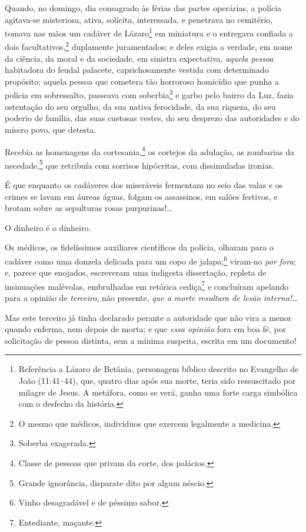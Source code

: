 Quando, no domingo, dia consagrado às férias das partes operárias, a
polícia agitava-se misteriosa, ativa, solícita, interessada, e
penetrava no cemitério, tomava nas mãos um cadáver de Lázaro\footnote{
  Referência a Lázaro de Betânia, personagem bíblico descrito no \label{lazaro}
  Evangelho de João (11:41--44), que, quatro dias após sua morte, teria
  sido ressuscitado por milagre de Jesus. A metáfora, como se verá,
  ganha uma forte carga simbólica com o desfecho da história.} em miniatura e o entregava confiada a dois
facultativos,\footnote{O mesmo que médicos, indivíduos que exercem
  legalmente a medicina.} duplamente juramentados; e deles exigia a
verdade, em nome da ciência, da moral e da sociedade, em sinistra
expectativa, \emph{aquela pessoa} habitadora do feudal palacete,
caprichosamente vestida com determinado propósito; aquela pessoa que
cometera tão horroroso homicídio que punha a polícia em sobressalto,
passeava com soberbia\footnote{Soberba exagerada.} e garbo pelo bairro
da Luz, fazia ostentação do seu orgulho, da sua nativa ferocidade, da
sua riqueza, do seu poderio de família, das suas custosas vestes, do seu
desprezo das autoridades e do mísero povo, que detesta.

Recebia as homenagens da cortesania,\footnote{Classe de pessoas que
  privam da corte, dos palácios.} os cortejos da adulação, as zombarias
da necedade,\footnote{Grande ignorância, disparate dito por algum
  néscio.} que retribuía com sorrisos hipócritas, com dissimuladas
ironias.

É que enquanto os cadáveres dos miseráveis fermentam no seio das valas e
os crimes se lavam em áureas águas, folgam os assassinos, em salões
festivos, e brotam sobre as sepulturas rosas purpurinas!\ldots{}

O dinheiro é o dinheiro.

Os médicos, os fidelíssimos auxiliares científicos da polícia, olharam
para o cadáver como uma donzela delicada para um copo de
jalapa;\footnote{Vinho desagradável e de péssimo sabor.} viram-no
\emph{por fora}; e, parece que enojados, escreveram uma indigesta
dissertação, repleta de insinuações malévolas, embrulhadas em retórica
cediça\footnote{Entediante, maçante.} e concluíram apelando para a
opinião de \emph{terceiro}, não presente, \emph{que a morte resultara de
lesão interna!\ldots{}}

Mas este terceiro já tinha declarado perante a autoridade que não vira a
menor quando enferma, nem depois de morta; e que \emph{essa opinião}
fora em boa fé, por solicitação de pessoa distinta, sem a mínima
suspeita, escrita em um documento!

